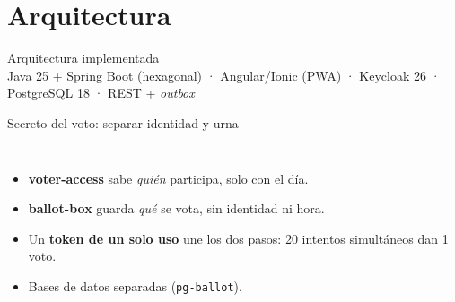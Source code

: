\documentclass[aspectratio=169,11pt]{beamer}
\newcommand{\diagrama}[1]{}
\begin{document}
\section{Arquitectura}
\begin{frame}{Arquitectura implementada}
  \centering
  \resizebox{!}{0.78\textheight}{\diagrama{arquitectura_implementada}}\\[2pt]
  \footnotesize Java 25 + Spring Boot (hexagonal) · Angular/Ionic (PWA) · Keycloak 26 · PostgreSQL 18 · REST + \emph{outbox}
\end{frame}

\begin{frame}{Secreto del voto: separar identidad y urna}
  \begin{columns}[T]
    \footnotesize
    \begin{itemize}
      \item \textbf{voter-access} sabe \emph{quién} participa, solo con el día.
      \item \textbf{ballot-box} guarda \emph{qué} se vota, sin identidad ni hora.
      \item Un \textbf{token de un solo uso} une los dos pasos: 20 intentos simultáneos dan 1 voto.
      \item Bases de datos separadas (\texttt{pg-ballot}).
    \end{itemize}
    \centering
    \resizebox{!}{0.80\textheight}{\diagrama{secuencia_emitir_voto_recibo}}
  \end{columns}
\end{frame}
\end{document}
